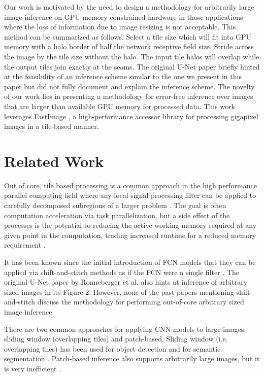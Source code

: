 \documentclass[runningheads]{llncs}
\begin{document}
Our work is motivated by the need to design a methodology for arbitrarily large image inference on GPU memory constrained hardware in those applications where the loss of information due to image resizing is not acceptable. This method can be summarized as follows. Select a tile size which will fit into GPU memory with a halo border of half the network receptive field size. Stride across the image by the tile size without the halo. The input tile halos will overlap while the output tiles join exactly at the seams. 
The original U-Net paper \cite{Ronneberger2015a} briefly hinted at the feasibility of an inference scheme similar to the one we present in this paper but did not fully document and explain the inference scheme. 
The novelty of our work lies in presenting a methodology for error-free inference over images that are larger than available GPU memory for processed data. This work leverages FastImage \cite{Bardakoff2019}, a high-performance accessor library for processing gigapixel images in a tile-based manner.

\section{Related Work}
\label{related-work}

Out of core, tile based processing is a common approach in the high performance parallel computing field where any local signal processing filter can be applied to carefully decomposed subregions of a larger problem \cite{Blattner2017}. The goal is often computation acceleration via task parallelization, but a side effect of the processes is the potential to reducing the active working memory required at any given point in the computation, trading increased runtime for a reduced memory requirement \cite{Blattner2017}. 

It has been known since the initial introduction of FCN models that they can be applied via shift-and-stitch methods as if the FCN were a single filter \cite{Long2015,Sherrah2016}.
The original U-Net paper by Ronneberger et al. \cite{Ronneberger2015a} also hints at inference of arbitrary sized images in its Figure 2. However, none of the past papers mentioning shift-and-stitch discuss the methodology for performing out-of-core arbitrary sized image inference.

There are two common approaches for applying CNN models to large images: sliding window (overlapping tiles) and patch-based. Sliding window (i.e. overlapping tiles) has been used for object detection \cite{Sermanet2013,VanEtten2019} and for semantic segmentation \cite{Lin2019,Volpi2017a}. Patch-based inference also supports arbitrarily large images, but it is very inefficient \cite{Volpi2017a,Maggiori2016}.
\end{document}
